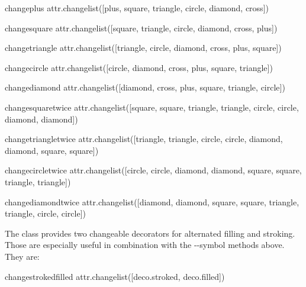 \begin{memberdesc}{changeplus}
  attr.changelist([plus, square, triangle, circle, diamond, cross])
\end{memberdesc}

\begin{memberdesc}{changesquare}
  attr.changelist([square, triangle, circle, diamond, cross, plus])
\end{memberdesc}

\begin{memberdesc}{changetriangle}
  attr.changelist([triangle, circle, diamond, cross, plus, square])
\end{memberdesc}

\begin{memberdesc}{changecircle}
  attr.changelist([circle, diamond, cross, plus, square, triangle])
\end{memberdesc}

\begin{memberdesc}{changediamond}
  attr.changelist([diamond, cross, plus, square, triangle, circle])
\end{memberdesc}

\begin{memberdesc}{changesquaretwice}
  attr.changelist([square, square, triangle, triangle, circle, circle, diamond, diamond])
\end{memberdesc}

\begin{memberdesc}{changetriangletwice}
  attr.changelist([triangle, triangle, circle, circle, diamond, diamond, square, square])
\end{memberdesc}

\begin{memberdesc}{changecircletwice}
  attr.changelist([circle, circle, diamond, diamond, square, square, triangle, triangle])
\end{memberdesc}

\begin{memberdesc}{changediamondtwice}
  attr.changelist([diamond, diamond, square, square, triangle, triangle, circle, circle])
\end{memberdesc}

The class  provides two changeable decorators for
alternated filling and stroking. Those are especially useful in
combination with the --symbol methods
above. They are:

\begin{memberdesc}{changestrokedfilled}
  attr.changelist([deco.stroked, deco.filled])
\end{memberdesc}

